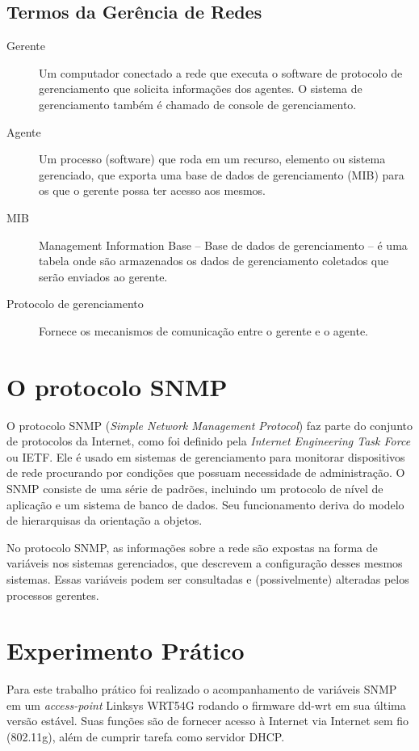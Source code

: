 \documentclass[brazil,times,12pt]{abnt}
\begin{document}
\subsection*{Termos da Gerência de Redes}
\begin{description}
\item[Gerente] Um computador conectado a rede que executa o software de protocolo de gerenciamento
que solicita informações dos agentes. O sistema de gerenciamento também é chamado de console de 
gerenciamento.
\item[Agente] Um processo (software) que roda em um recurso, elemento ou sistema gerenciado, que exporta
uma base de dados de gerenciamento (MIB) para os que o gerente possa ter acesso aos mesmos.
\item[MIB] Management Information Base – Base de dados de gerenciamento – é uma tabela onde são 
armazenados os dados de gerenciamento coletados que serão enviados ao gerente.
\item[Protocolo de gerenciamento] Fornece os mecanismos de comunicação entre o
gerente e o agente. \cite{wiki:gerencia_redes}
\end{description}
	
\section*{O protocolo SNMP}
O protocolo SNMP (\emph{Simple Network Management Protocol}) faz parte do
conjunto de protocolos da Internet, como foi definido pela \emph{Internet
Engineering Task Force} ou IETF. Ele é usado em sistemas de gerenciamento para
monitorar dispositivos de rede procurando por condições que possuam necessidade
de administração. O SNMP consiste de uma série de padrões, incluindo um
protocolo de nível de aplicação e um sistema de banco de dados. Seu
funcionamento deriva do modelo de hierarquisas da orientação a objetos.

No protocolo SNMP, as informações sobre a rede são expostas na forma de
variáveis nos sistemas gerenciados, que descrevem a configuração desses mesmos
sistemas. Essas variáveis podem ser consultadas e (possivelmente) alteradas
pelos processos gerentes. \cite{wiki:snmp}

\section*{Experimento Prático}
Para este trabalho prático foi realizado o acompanhamento de variáveis SNMP em
um \emph{access-point} Linksys WRT54G rodando o firmware dd-wrt em sua última
versão estável. Suas funções são de fornecer acesso à Internet via Internet sem
fio (802.11g), além de cumprir tarefa como servidor DHCP.
\end{document}
